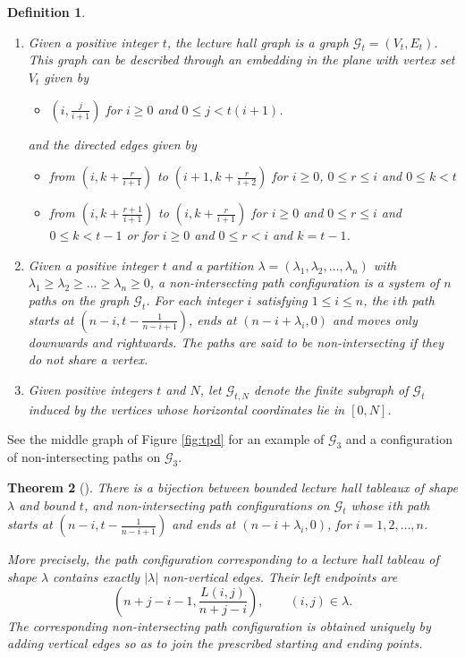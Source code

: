 \documentclass[11pt]{amsart}
\theoremstyle{plain}
\newtheorem{theorem}{Theorem}
\newtheorem{definition}[theorem]{Definition}
\numberwithin{equation}{section}
\numberwithin{theorem}{section}
\numberwithin{figure}{section}
\begin{document}
\begin{definition}\label{dflhg}
\begin{enumerate}
\item Given a positive integer $t$, the lecture hall graph is a graph $\mathcal{G}_t=(V_t,E_t)$. This graph can be described through an embedding in the plane with vertex set $V_t$ given by
\begin{itemize}
    \item $\left(i,\frac{j}{i+1}\right)$ for $i\geq 0$ and $0\leq j<t(i+1)$.
\end{itemize}
and the directed edges given by
\begin{itemize}
    \item from $\left(i,k+\frac{r}{i+1}\right)$
    to $\left(i+1,k+\frac{r}{i+2}\right)$ for $i\geq 0$, $0\leq r\leq i$ and $0\leq k<t$
    \item from $\left(i,k + \frac{r + 1}{i + 1}\right)$ to $\left(i,k + \frac{r}{i + 1}\right)$ for $i\geq 0$ and $0\leq r \leq i$ and
$0 \leq k < t-1$ or for $i\geq 0$ and $0\leq r <i$ and $k = t-1$.
\end{itemize}
\item Given a positive integer $t$ and a partition $\lambda=(\lambda_1,\lambda_2,\ldots,\lambda_n)$ with $\lambda_1\geq \lambda_2\geq\ldots\geq \lambda_n\geq 0$, a non-intersecting path configuration is a system of $n$ paths on the graph $\mathcal{G}_t$. For each integer $i$ satisfying $1\leq i\leq n$, the $i$th path starts at $\left(n-i,t-\frac{1}{n-i+1}\right)$, ends at $(n-i+\lambda_i,0)$ and moves only downwards and rightwards. The paths are said to be non-intersecting if they do not share a vertex.
\item\label{item:finite-horizontal-truncation}
{
Given positive integers $t$ and $N$, let $\mathcal G_{t,N}$ denote the
finite subgraph of $\mathcal G_t$ induced by the vertices whose horizontal
coordinates lie in $[0,N]$.
}
\end{enumerate}
\end{definition}

See the middle graph of Figure \ref{fig:tpd} for an example of $\mathcal{G}_3$ and a configuration of non-intersecting paths on $\mathcal{G}_3$.




\begin{theorem}[\cite{CK20}]
\label{thm:path-bijection}
There is a bijection between bounded lecture hall tableaux of shape
$\lambda$ and bound $t$, and non-intersecting path configurations on
$\mathcal G_t$ whose $i$th path starts at
$\left(n-i,t-\frac{1}{n-i+1}\right)$ and ends at
$(n-i+\lambda_i,0)$, for $i=1,2,\ldots,n$.

More precisely, the path configuration corresponding to a lecture hall
tableau of shape $\lambda$ contains exactly $|\lambda|$ non-vertical
edges. Their left endpoints are
\[
    \left(n+j-i-1,\frac{L(i,j)}{n+j-i}\right),
    \qquad (i,j)\in\lambda.
\]
The corresponding non-intersecting path configuration is obtained uniquely
by adding vertical edges so as to join the prescribed starting and ending
points.
\end{theorem}
\end{document}

